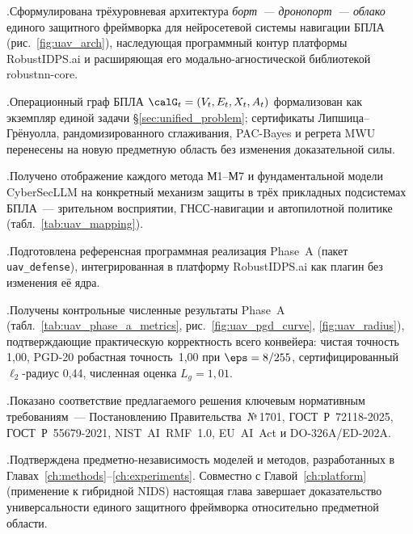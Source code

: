 .\quad Сформулирована трёхуровневая архитектура \emph{борт~---
дронопорт~--- облако} единого защитного фреймворка для нейросетевой
системы навигации БПЛА (рис.~\ref{fig:uav_arch}), наследующая
программный контур платформы \textsf{RobustIDPS.ai} и расширяющая его
модально-агностической библиотекой \textsf{robustnn-core}.

.\quad Операционный граф БПЛА $\calG_t = (V_t,E_t,X_t,A_t)$
формализован как экземпляр единой задачи \S\ref{sec:unified_problem};
сертификаты Липшица--Грёнуолла, рандомизированного сглаживания,
PAC-Bayes и регрета MWU перенесены на новую предметную область без
изменения доказательной силы.

.\quad Получено отображение каждого метода \textsf{М1}--\textsf{М7}
и фундаментальной модели \textsf{CyberSecLLM} на конкретный механизм
защиты в трёх прикладных подсистемах БПЛА~--- зрительном восприятии,
ГНСС-навигации и автопилотной политике (табл.~\ref{tab:uav_mapping}).

.\quad Подготовлена референсная программная реализация
Phase~A (пакет \texttt{uav\_defense}), интегрированная в платформу
\textsf{RobustIDPS.ai} как плагин без изменения её ядра.

.\quad Получены контрольные численные результаты Phase~A
(табл.~\ref{tab:uav_phase_a_metrics}, рис.~\ref{fig:uav_pgd_curve},
\ref{fig:uav_radius}), подтверждающие практическую корректность всего
конвейера: чистая точность 1,00, PGD-20 робастная точность~1,00 при
$\eps=8/255$, сертифицированный $\ell_2$-радиус 0,44, численная
оценка $L_g=1{,}01$.

.\quad Показано соответствие предлагаемого решения ключевым
нормативным требованиям~--- Постановлению Правительства~№\,1701,
\mbox{ГОСТ~Р~72118-2025}, \mbox{ГОСТ~Р~55679-2021},
\mbox{NIST~AI~RMF~1.0}, \mbox{EU~AI~Act} и \mbox{DO-326A/ED-202A}.

.\quad Подтверждена предметно-независимость моделей и
методов, разработанных в Главах~\ref{ch:methods}--\ref{ch:experiments}.
Совместно с Главой~\ref{ch:platform} (применение к гибридной NIDS)
настоящая глава завершает доказательство универсальности единого
защитного фреймворка относительно предметной области.
